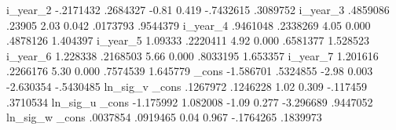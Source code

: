         i_year_2 {\VBAR}  -.2171432   .2684327    -0.81   0.419    -.7432615    .3089752
        i_year_3 {\VBAR}   .4859086     .23905     2.03   0.042     .0173793    .9544379
        i_year_4 {\VBAR}   .9461048   .2338269     4.05   0.000     .4878126    1.404397
        i_year_5 {\VBAR}    1.09333   .2220411     4.92   0.000     .6581377    1.528523
        i_year_6 {\VBAR}   1.228338   .2168503     5.66   0.000     .8033195    1.653357
        i_year_7 {\VBAR}   1.201616   .2266176     5.30   0.000     .7574539    1.645779
           _cons {\VBAR}  -1.586701   .5324855    -2.98   0.003    -2.630354   -.5430485
ln_sig_v         {\VBAR}
           _cons {\VBAR}   .1267972   .1246228     1.02   0.309     -.117459    .3710534
ln_sig_u         {\VBAR}
           _cons {\VBAR}  -1.175992   1.082008    -1.09   0.277    -3.296689    .9447052
ln_sig_w         {\VBAR}
           _cons {\VBAR}   .0037854   .0919465     0.04   0.967    -.1764265    .1839973
